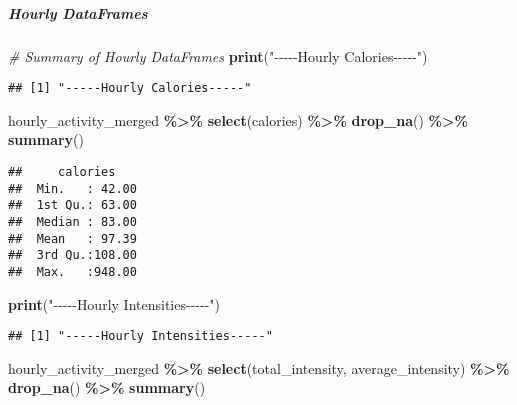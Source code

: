 \documentclass[
]{article}
\newenvironment{Shaded}{\begin{snugshade}}{\end{snugshade}}
\newcommand{\CommentTok}[1]{\textcolor[rgb]{0.56,0.35,0.01}{\textit{#1}}}
\newcommand{\FunctionTok}[1]{\textcolor[rgb]{0.13,0.29,0.53}{\textbf{#1}}}
\newcommand{\NormalTok}[1]{#1}
\newcommand{\SpecialCharTok}[1]{\textcolor[rgb]{0.81,0.36,0.00}{\textbf{#1}}}
\newcommand{\StringTok}[1]{\textcolor[rgb]{0.31,0.60,0.02}{#1}}
\begin{document}
\hypertarget{hourly-dataframes-9}{%
\subparagraph{Hourly DataFrames}\label{hourly-dataframes-9}}

\begin{Shaded}
\begin{Highlighting}[]
\CommentTok{\# Summary of Hourly DataFrames}
\FunctionTok{print}\NormalTok{(}\StringTok{"{-}{-}{-}{-}{-}Hourly Calories{-}{-}{-}{-}{-}"}\NormalTok{)}
\end{Highlighting}
\end{Shaded}

\begin{verbatim}
## [1] "-----Hourly Calories-----"
\end{verbatim}

\begin{Shaded}
\begin{Highlighting}[]
\NormalTok{hourly\_activity\_merged }\SpecialCharTok{\%\textgreater{}\%} 
 \FunctionTok{select}\NormalTok{(calories) }\SpecialCharTok{\%\textgreater{}\%} 
 \FunctionTok{drop\_na}\NormalTok{() }\SpecialCharTok{\%\textgreater{}\%} 
 \FunctionTok{summary}\NormalTok{()}
\end{Highlighting}
\end{Shaded}

\begin{verbatim}
##     calories     
##  Min.   : 42.00  
##  1st Qu.: 63.00  
##  Median : 83.00  
##  Mean   : 97.39  
##  3rd Qu.:108.00  
##  Max.   :948.00
\end{verbatim}

\begin{Shaded}
\begin{Highlighting}[]
\FunctionTok{print}\NormalTok{(}\StringTok{"{-}{-}{-}{-}{-}Hourly Intensities{-}{-}{-}{-}{-}"}\NormalTok{)}
\end{Highlighting}
\end{Shaded}

\begin{verbatim}
## [1] "-----Hourly Intensities-----"
\end{verbatim}

\begin{Shaded}
\begin{Highlighting}[]
\NormalTok{hourly\_activity\_merged }\SpecialCharTok{\%\textgreater{}\%} 
 \FunctionTok{select}\NormalTok{(total\_intensity, average\_intensity) }\SpecialCharTok{\%\textgreater{}\%} 
 \FunctionTok{drop\_na}\NormalTok{() }\SpecialCharTok{\%\textgreater{}\%} 
 \FunctionTok{summary}\NormalTok{()}
\end{Highlighting}
\end{Shaded}
\end{document}
